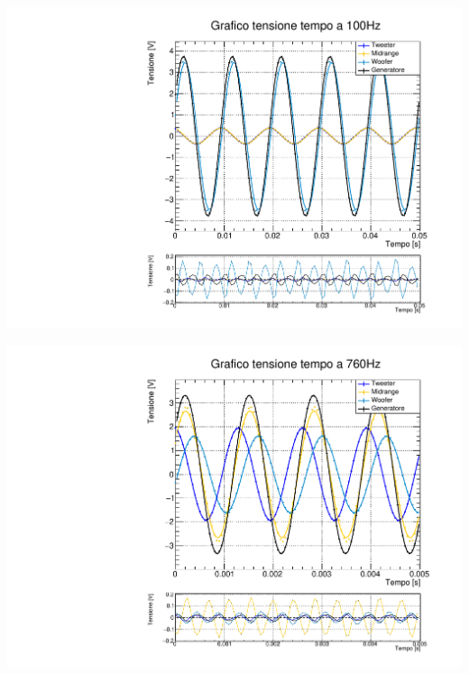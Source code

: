 \documentclass[]{article}
\begin{document}
	\begin{multicols}{2}
		
		\includegraphics[width=1\linewidth]{img/100hz}
		
		\includegraphics[width=1\linewidth]{img/760hz}
		
		
	\end{multicols}
\end{document}
